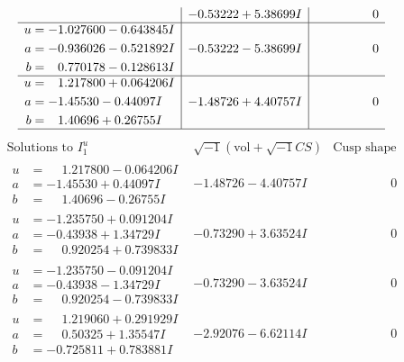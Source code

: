 \documentclass[1p]{elsarticle_modified}
\theoremstyle{definition}
\newcommand{\I}{\sqrt{-1}}
\begin{document}
$$\begin{array}{c|c|c}
 & -0.53222 + 5.38699 I & \phantom{-0.000000 } 0 \\ \hline\begin{aligned}
u &= -1.027600 - 0.643845 I \\
a &= -0.936026 - 0.521892 I \\
b &= \phantom{-}0.770178 - 0.128613 I\end{aligned}
 & -0.53222 - 5.38699 I & \phantom{-0.000000 } 0 \\ \hline\begin{aligned}
u &= \phantom{-}1.217800 + 0.064206 I \\
a &= -1.45530 - 0.44097 I \\
b &= \phantom{-}1.40696 + 0.26755 I\end{aligned}
 & -1.48726 + 4.40757 I & \phantom{-0.000000 } 0\\
 \hline 
 \end{array}$$\newpage$$\begin{array}{c|c|c}  
\text{Solutions to }I^u_{1}& \I (\text{vol} + \sqrt{-1}CS) & \text{Cusp shape}\\
 \hline 
\begin{aligned}
u &= \phantom{-}1.217800 - 0.064206 I \\
a &= -1.45530 + 0.44097 I \\
b &= \phantom{-}1.40696 - 0.26755 I\end{aligned}
 & -1.48726 - 4.40757 I & \phantom{-0.000000 } 0 \\ \hline\begin{aligned}
u &= -1.235750 + 0.091204 I \\
a &= -0.43938 + 1.34729 I \\
b &= \phantom{-}0.920254 + 0.739833 I\end{aligned}
 & -0.73290 + 3.63524 I & \phantom{-0.000000 } 0 \\ \hline\begin{aligned}
u &= -1.235750 - 0.091204 I \\
a &= -0.43938 - 1.34729 I \\
b &= \phantom{-}0.920254 - 0.739833 I\end{aligned}
 & -0.73290 - 3.63524 I & \phantom{-0.000000 } 0 \\ \hline\begin{aligned}
u &= \phantom{-}1.219060 + 0.291929 I \\
a &= \phantom{-}0.50325 + 1.35547 I \\
b &= -0.725811 + 0.783881 I\end{aligned}
 & -2.92076 - 6.62114 I & \phantom{-0.000000 } 0 \\ \hline\begin{aligned}

\end{aligned}
\end{array}$$
\end{document}

